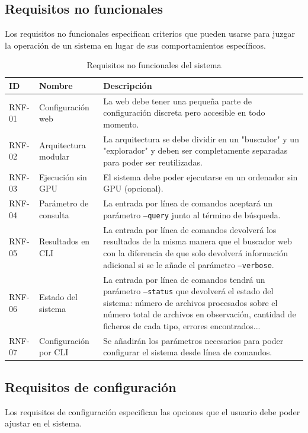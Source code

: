 \subsection{Requisitos no funcionales}
Los requisitos no funcionales especifican criterios que pueden usarse para juzgar la operación de un sistema en lugar de sus comportamientos específicos.

\begin{table}[H]
\centering
\begin{tabular}{|p{1cm}|p{4cm}|p{9cm}|}
\hline
\textbf{ID} & \textbf{Nombre} & \textbf{Descripción} \\
\hline
RNF-01 & Configuración web & La web debe tener una pequeña parte de configuración discreta pero accesible en todo momento. \\
\hline
RNF-02 & Arquitectura modular & La arquitectura se debe dividir en un "buscador" y un "explorador" y deben ser completamente separadas para poder ser reutilizadas. \\
\hline
RNF-03 & Ejecución sin GPU & El sistema debe poder ejecutarse en un ordenador sin GPU (opcional). \\
\hline
RNF-04 & Parámetro de consulta & La entrada por línea de comandos aceptará un parámetro \texttt{--query} junto al término de búsqueda. \\
\hline
RNF-05 & Resultados en CLI & La entrada por línea de comandos devolverá los resultados de la misma manera que el buscador web con la diferencia de que solo devolverá información adicional si se le añade el parámetro \texttt{--verbose}. \\
\hline
RNF-06 & Estado del sistema & La entrada por línea de comandos tendrá un parámetro \texttt{--status} que devolverá el estado del sistema: número de archivos procesados sobre el número total de archivos en observación, cantidad de ficheros de cada tipo, errores encontrados... \\
\hline
RNF-07 & Configuración por CLI & Se añadirán los parámetros necesarios para poder configurar el sistema desde línea de comandos. \\
\hline
\end{tabular}
\caption{Requisitos no funcionales del sistema}
\label{tab:req_no_funcionales}
\end{table}

\subsection{Requisitos de configuración}
Los requisitos de configuración especifican las opciones que el usuario debe poder ajustar en el sistema.


